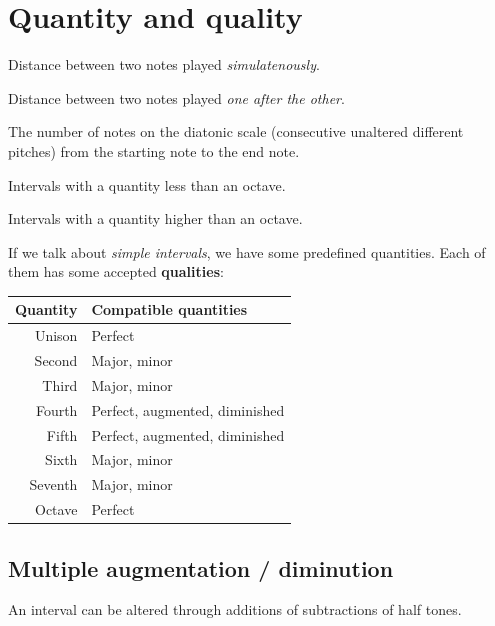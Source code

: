 \section{Quantity and quality}
\begin{definition}
    Distance between two notes played \emph{simulatenously}.
\end{definition}

\begin{definition}
    Distance between two notes played \emph{one after the other}.
\end{definition}

\begin{definition}
    The number of notes on the diatonic scale (consecutive unaltered different pitches) from the starting note to the end note.
\end{definition}

\begin{definition}
    Intervals with a quantity less than an octave.
\end{definition}

\begin{definition}
    Intervals with a quantity higher than an octave.
\end{definition}

If we talk about \emph{simple intervals}, we have some predefined quantities. Each of them has some accepted \textbf{qualities}:

\begin{center}
    \begin{tabular}{r|l}
        \textbf{Quantity} & Compatible \textbf{quantities} \\
        \hline
        Unison & Perfect \\
        Second & Major, minor \\
        Third & Major, minor \\
        Fourth & Perfect, augmented, diminished \\
        Fifth & Perfect, augmented, diminished \\
        Sixth & Major, minor \\
        Seventh & Major, minor \\
        Octave & Perfect
    \end{tabular}
\end{center}

\subsection{Multiple augmentation / diminution}
An interval can be altered through additions of subtractions of half tones.

